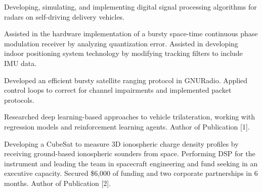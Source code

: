\documentclass[10pt,a4paper,ragged2e,withhyper]{altacv}
\begin{document}
\begin{paracol}{2}

Developing, simulating, and implementing digital signal processing algorithms for radars on self-driving delivery vehicles.

\divider

Assisted in the hardware implementation of a bursty space-time continuous phase modulation receiver by analyzing quantization error. Assisted in developing indoor positioning system technology by modifying tracking filters to include IMU data.

\divider

Developed an efficient bursty satellite ranging protocol in GNURadio. Applied control loops to correct for channel impairments and implemented packet protocols.

\divider

Researched deep learning-based approaches to vehicle trilateration, working with regression models and reinforcement learning agents. Author of Publication [1].

\divider

Developing a CubeSat to measure 3D ionospheric charge density profiles by receiving ground-based ionospheric sounders from space. Performing DSP for the instrument and leading the team in spacecraft engineering and fund seeking in an executive capacity. Secured \$6,000 of funding and two corporate partnerships in 6 months. Author of Publication [2].

\switchcolumn


\end{paracol}
\end{document}
